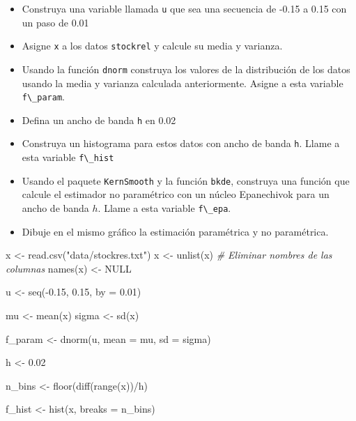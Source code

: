 \documentclass[
  12pt,
]{book}
\newenvironment{Shaded}{\begin{snugshade}}{\end{snugshade}}
\newcommand{\AttributeTok}[1]{\textcolor[rgb]{0.77,0.63,0.00}{#1}}
\newcommand{\CommentTok}[1]{\textcolor[rgb]{0.56,0.35,0.01}{\textit{#1}}}
\newcommand{\ConstantTok}[1]{\textcolor[rgb]{0.00,0.00,0.00}{#1}}
\newcommand{\FloatTok}[1]{\textcolor[rgb]{0.00,0.00,0.81}{#1}}
\newcommand{\FunctionTok}[1]{\textcolor[rgb]{0.00,0.00,0.00}{#1}}
\newcommand{\NormalTok}[1]{#1}
\newcommand{\OtherTok}[1]{\textcolor[rgb]{0.56,0.35,0.01}{#1}}
\newcommand{\SpecialCharTok}[1]{\textcolor[rgb]{0.00,0.00,0.00}{#1}}
\newcommand{\StringTok}[1]{\textcolor[rgb]{0.31,0.60,0.02}{#1}}
\providecommand{\tightlist}{%
  \setlength{\itemsep}{0pt}\setlength{\parskip}{0pt}}
\begin{document}
\begin{itemize}
\tightlist
\item
  Construya una variable llamada \texttt{u} que sea una secuencia de
  -0.15 a 0.15 con un paso de 0.01
\item
  Asigne \texttt{x} a los datos \texttt{stockrel} y calcule su media y
  varianza.
\item
  Usando la función \texttt{dnorm} construya los valores de la
  distribución de los datos usando la media y varianza calculada
  anteriormente. Asigne a esta variable
  \texttt{f\textbackslash{}\_param}.
\item
  Defina un ancho de banda \texttt{h} en 0.02
\item
  Construya un histograma para estos datos con ancho de banda
  \texttt{h}. Llame a esta variable \texttt{f\textbackslash{}\_hist}
\item
  Usando el paquete \texttt{KernSmooth} y la función \texttt{bkde},
  construya una función que calcule el estimador no paramétrico con un
  núcleo Epanechivok para un ancho de banda \(h\). Llame a esta variable
  \texttt{f\textbackslash{}\_epa}.
\item
  Dibuje en el mismo gráfico la estimación paramétrica y no paramétrica.
\end{itemize}

\begin{Shaded}
\begin{Highlighting}[]
\NormalTok{x }\OtherTok{\textless{}{-}} \FunctionTok{read.csv}\NormalTok{(}\StringTok{"data/stockres.txt"}\NormalTok{)}
\NormalTok{x }\OtherTok{\textless{}{-}} \FunctionTok{unlist}\NormalTok{(x)}
\CommentTok{\# Eliminar nombres de las columnas}
\FunctionTok{names}\NormalTok{(x) }\OtherTok{\textless{}{-}} \ConstantTok{NULL}

\NormalTok{u }\OtherTok{\textless{}{-}} \FunctionTok{seq}\NormalTok{(}\SpecialCharTok{{-}}\FloatTok{0.15}\NormalTok{, }\FloatTok{0.15}\NormalTok{, }\AttributeTok{by =} \FloatTok{0.01}\NormalTok{)}

\NormalTok{mu }\OtherTok{\textless{}{-}} \FunctionTok{mean}\NormalTok{(x)}
\NormalTok{sigma }\OtherTok{\textless{}{-}} \FunctionTok{sd}\NormalTok{(x)}

\NormalTok{f\_param }\OtherTok{\textless{}{-}} \FunctionTok{dnorm}\NormalTok{(u, }\AttributeTok{mean =}\NormalTok{ mu, }\AttributeTok{sd =}\NormalTok{ sigma)}

\NormalTok{h }\OtherTok{\textless{}{-}} \FloatTok{0.02}

\NormalTok{n\_bins }\OtherTok{\textless{}{-}} \FunctionTok{floor}\NormalTok{(}\FunctionTok{diff}\NormalTok{(}\FunctionTok{range}\NormalTok{(x))}\SpecialCharTok{/}\NormalTok{h)}

\NormalTok{f\_hist }\OtherTok{\textless{}{-}} \FunctionTok{hist}\NormalTok{(x, }\AttributeTok{breaks =}\NormalTok{ n\_bins)}
\end{Highlighting}
\end{Shaded}
\end{document}
